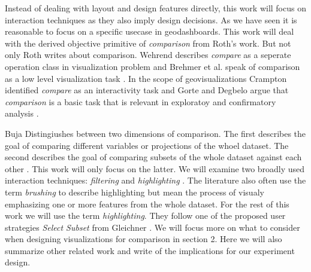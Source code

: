 \documentclass[12pt, twoside]{article}
\begin{document}
Instead of dealing with layout and design features directly, this work will focus on
interaction techniques as they also imply design decisions. As we have seen it is
reasonable to focus on a specific usecase in geodashboards. This work will deal with
the derived objective primitive of \textit{comparison} from Roth's work. But not
only Roth writes about comparison. Wehrend describes \textit{compare} as a seperate
operation class in visualization problem \citep{Wehrend.1990} and Brehmer et al.
speak of comparison as a low level visualization task \citep*{Brehmer.2013}. In the
scope of geovisualizations Crampton identified \textit{compare} as an interactivity task
\citep{Crampton.2002} and Gorte and Degbelo argue that \textit{comparison} is a basic
task that is relevant in exploratoy and confirmatory analysis \citep{Gorte.2022}.

Buja Distingiushes between two dimensions of comparison. The first
describes the goal of comparing different variables or projections of the whoel dataset.
The second describes the goal of comparing subsets of the whole dataset against each
other \citep*{Buja.1996}. This work will only focus on the latter. 
We will examine two broadly used interaction techniques: \textit{filtering} and
\textit{highlighting} \citep*{Keim.2005,Roth.2013}. The literature also often use the term \textit{brushing} 
to describe highlighting but mean the process of visualy emphasizing one or more features from the
whole dataset. For the rest of this work we will use the term \textit{highlighting}.
They follow one of the proposed user strategies
\textit{Select Subset} from Gleichner \citep*{Gleicher.2018}. We will focus more on what to 
consider when designing visualizations for comparison in section 2. Here we will also summarize other
related work and write of the implications for our experiment design.
\end{document}
